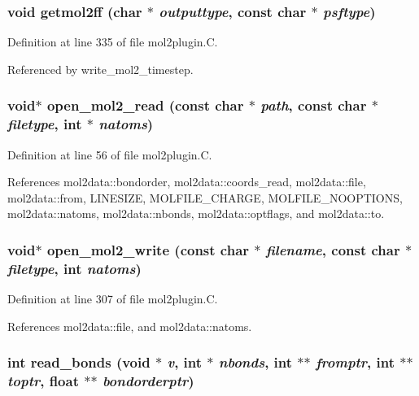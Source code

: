 \subsubsection{\setlength{\rightskip}{0pt plus 5cm}void getmol2ff (char $\ast$ {\em outputtype}, const char $\ast$ {\em psftype})}\label{mol2plugin_8C_a8}




Definition at line 335 of file mol2plugin.C.

Referenced by write\_\-mol2\_\-timestep.
\subsubsection{\setlength{\rightskip}{0pt plus 5cm}void$\ast$ open\_\-mol2\_\-read (const char $\ast$ {\em path}, const char $\ast$ {\em filetype}, int $\ast$ {\em natoms})\hspace{0.3cm}{\tt  [static]}}\label{mol2plugin_8C_a2}




Definition at line 56 of file mol2plugin.C.

References mol2data::bondorder, mol2data::coords\_\-read, mol2data::file, mol2data::from, LINESIZE, MOLFILE\_\-CHARGE, MOLFILE\_\-NOOPTIONS, mol2data::natoms, mol2data::nbonds, mol2data::optflags, and mol2data::to.
\subsubsection{\setlength{\rightskip}{0pt plus 5cm}void$\ast$ open\_\-mol2\_\-write (const char $\ast$ {\em filename}, const char $\ast$ {\em filetype}, int {\em natoms})\hspace{0.3cm}{\tt  [static]}}\label{mol2plugin_8C_a6}




Definition at line 307 of file mol2plugin.C.

References mol2data::file, and mol2data::natoms.
\subsubsection{\setlength{\rightskip}{0pt plus 5cm}int read\_\-bonds (void $\ast$ {\em v}, int $\ast$ {\em nbonds}, int $\ast$$\ast$ {\em fromptr}, int $\ast$$\ast$ {\em toptr}, float $\ast$$\ast$ {\em bondorderptr})\hspace{0.3cm}{\tt  [static]}}\label{mol2plugin_8C_a13}





